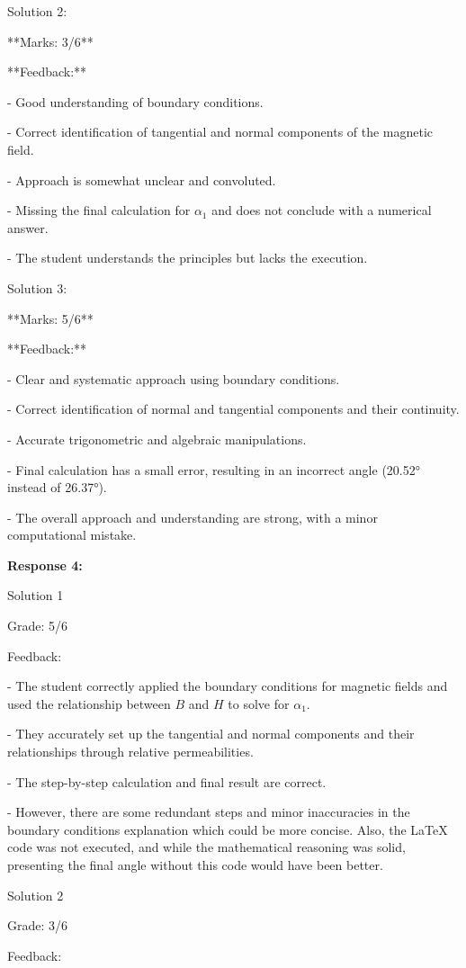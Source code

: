 \documentclass[a4paper,11pt]{article}
\begin{document}
Solution 2: 

**Marks: 3/6**

**Feedback:**

- Good understanding of boundary conditions.

- Correct identification of tangential and normal components of the magnetic field.

- Approach is somewhat unclear and convoluted.

- Missing the final calculation for \(\alpha_{1}\) and does not conclude with a numerical answer.

- The student understands the principles but lacks the execution.

Solution 3:

**Marks: 5/6**

**Feedback:**

- Clear and systematic approach using boundary conditions.

- Correct identification of normal and tangential components and their continuity.

- Accurate trigonometric and algebraic manipulations.

- Final calculation has a small error, resulting in an incorrect angle (20.52° instead of 26.37°).

- The overall approach and understanding are strong, with a minor computational mistake.

\bigskip 
\textbf{Response 4:}

Solution 1

Grade: 5/6

Feedback:

- The student correctly applied the boundary conditions for magnetic fields and used the relationship between \( B \) and \( H \) to solve for \( \alpha_1 \).
 
- They accurately set up the tangential and normal components and their relationships through relative permeabilities.

- The step-by-step calculation and final result are correct.

- However, there are some redundant steps and minor inaccuracies in the boundary conditions explanation which could be more concise. Also, the LaTeX code was not executed, and while the mathematical reasoning was solid, presenting the final angle without this code would have been better.

Solution 2

Grade: 3/6

Feedback:
\end{document}
